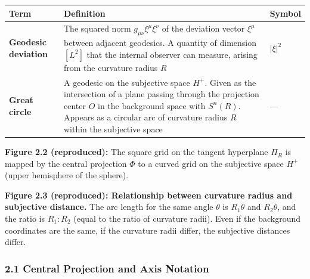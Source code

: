 \documentclass[a4paper,11pt]{article}
\theoremstyle{definition}
\begin{document}
{\def\LTcaptype{table} %
\begin{longtable}[]{@{}
  >{\raggedright\arraybackslash}p{}
  >{\raggedright\arraybackslash}p{}
  >{\raggedright\arraybackslash}p{}@{}}
\toprule\noalign{}
\begin{minipage}[b]{\linewidth}\raggedright
Term
\end{minipage} & \begin{minipage}[b]{\linewidth}\raggedright
Definition
\end{minipage} & \begin{minipage}[b]{\linewidth}\raggedright
Symbol
\end{minipage} \\
\midrule\noalign{}
\endhead
\bottomrule\noalign{}
\endlastfoot
\textbf{Geodesic deviation} & The squared norm \(g_{\mu\nu}\xi^\mu\xi^\nu\) of the deviation vector \(\xi^\mu\) between adjacent geodesics. A quantity of dimension \([L^2]\) that the internal observer can measure, arising from the curvature radius \(R\) & \(\lvert\xi\rvert^2\) \\
\textbf{Great circle} & A geodesic on the subjective space \(H^+\). Given as the intersection of a plane passing through the projection center \(O\) in the background space with \(S^n(R)\). Appears as a circular arc of curvature radius \(R\) within the subjective space & --- \\
\end{longtable}
}

\textbf{Figure 2.2 (reproduced):} The square grid on the tangent hyperplane \(\Pi_R\) is mapped by the central projection \(\Phi\) to a curved grid on the subjective space \(H^+\) (upper hemisphere of the sphere).

\textbf{Figure 2.3 (reproduced): Relationship between curvature radius and subjective distance.} The arc length for the same angle \(\theta\) is \(R_1\theta\) and \(R_2\theta\), and the ratio is \(R_1 : R_2\) (equal to the ratio of curvature radii). Even if the background coordinates are the same, if the curvature radii differ, the subjective distances differ.

\subsubsection{2.1 Central Projection and Axis Notation}\label{central-projection-and-axis-notation}
\end{document}
